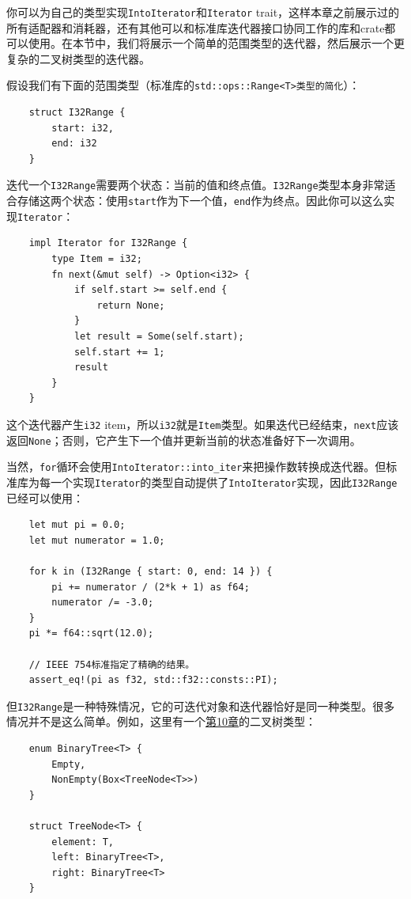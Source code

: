 你可以为自己的类型实现\texttt{IntoIterator}和\texttt{Iterator} trait，这样本章之前展示过的所有适配器和消耗器，还有其他可以和标准库迭代器接口协同工作的库和crate都可以使用。在本节中，我们将展示一个简单的范围类型的迭代器，然后展示一个更复杂的二叉树类型的迭代器。

假设我们有下面的范围类型（标准库的\texttt{std::ops::Range<T>类型的简化}）：
\begin{verbatim}
    struct I32Range {
        start: i32,
        end: i32
    }
\end{verbatim}

迭代一个\texttt{I32Range}需要两个状态：当前的值和终点值。\texttt{I32Range}类型本身非常适合存储这两个状态：使用\texttt{start}作为下一个值，\texttt{end}作为终点。因此你可以这么实现\texttt{Iterator}：
\begin{verbatim}
    impl Iterator for I32Range {
        type Item = i32;
        fn next(&mut self) -> Option<i32> {
            if self.start >= self.end {
                return None;
            }
            let result = Some(self.start);
            self.start += 1;
            result
        }
    }
\end{verbatim}
这个迭代器产生\texttt{i32} item，所以\texttt{i32}就是\texttt{Item}类型。如果迭代已经结束，\texttt{next}应该返回\texttt{None}；否则，它产生下一个值并更新当前的状态准备好下一次调用。

当然，\texttt{for}循环会使用\texttt{IntoIterator::into\_iter}来把操作数转换成迭代器。但标准库为每一个实现\texttt{Iterator}的类型自动提供了\texttt{IntoIterator}实现，因此\texttt{I32Range}已经可以使用：
\begin{verbatim}
    let mut pi = 0.0;
    let mut numerator = 1.0;

    for k in (I32Range { start: 0, end: 14 }) {
        pi += numerator / (2*k + 1) as f64;
        numerator /= -3.0;
    }
    pi *= f64::sqrt(12.0);

    // IEEE 754标准指定了精确的结果。
    assert_eq!(pi as f32, std::f32::consts::PI);
\end{verbatim}

但\texttt{I32Range}是一种特殊情况，它的可迭代对象和迭代器恰好是同一种类型。很多情况并不是这么简单。例如，这里有一个\hyperref[ch10]{第10章}的二叉树类型：
\begin{verbatim}
    enum BinaryTree<T> {
        Empty,
        NonEmpty(Box<TreeNode<T>>)
    }

    struct TreeNode<T> {
        element: T,
        left: BinaryTree<T>,
        right: BinaryTree<T>
    }
\end{verbatim}

